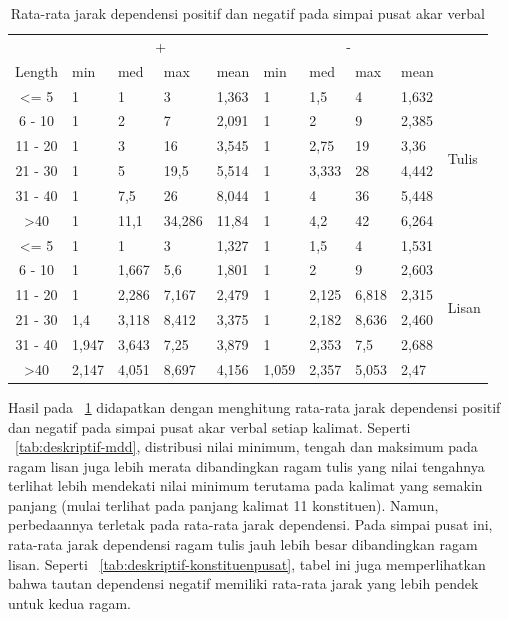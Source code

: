 \documentclass[10pt, a4paper, conference, compsocconf]{IEEEtran}
\begin{document}
\begin{table}
\begin{center}
\tiny
\caption{Rata-rata jarak dependensi positif dan negatif pada simpai pusat akar verbal}  \label{tab:deskriptif-mddpusat}
\begin{tabular}{c l l l l l l l l l}
\hline
 & \multicolumn{4}{c}{+} & \multicolumn{4}{c}{-} & \\  \cline{2-9}  
Length & min 	& med	& max 	& mean 	& min 	& med 	& max 	& mean 	& \\ \cline{1-10}  
\textless= 5 	& 1 		& 1 		& 3	 	& 1,363	& 1 		& 1,5		& 4	 	& 1,632	&\multirow{6}{*}{Tulis}\\
6 - 10 		& 1 		& 2		& 7	 	& 2,091	& 1 		& 2	 	& 9	 	& 2,385	& 	\\
11 - 20 		& 1 		& 3	 	& 16	 	& 3,545	& 1 		& 2,75 	& 19	 	& 3,36 	& 	\\
21 - 30 		& 1 		& 5	 	& 19,5 	& 5,514	& 1 		& 3,333	& 28		& 4,442	& 	\\ 
31 - 40 		& 1	 	& 7,5	 	& 26		& 8,044	& 1 		& 4		& 36		& 5,448	& 	\\
\textgreater 40 	& 1	 	& 11,1	& 34,286	& 11,84	& 1 		& 4,2		& 42		& 6,264	& 	\\ 
\hline
\textless= 5 	& 1 		& 1 		& 3		& 1,327	& 1 		& 1,5 	& 4		& 1,531	& \multirow{6}{*}{Lisan}\\
6 - 10 		& 1 		& 1,667	& 5,6		& 1,801	& 1 		& 2		& 9		& 2,603	& \\
11 - 20 		& 1 		& 2,286	& 7,167	& 2,479	& 1 		& 2,125	& 6,818	& 2,315	& \\
21 - 30 		& 1,4	 	& 3,118	& 8,412	& 3,375	& 1 		& 2,182	& 8,636	& 2,460	& \\ 
31 - 40 		& 1,947	& 3,643	& 7,25	& 3,879	& 1 		& 2,353	& 7,5		& 2,688	& \\
\textgreater 40 	& 2,147	 & 4,051	& 8,697	& 4,156	& 1,059	& 2,357	& 5,053	& 2,47	& \\ 
\hline
\end{tabular}
\end{center}
\end{table}

Hasil pada \tab~\ref{tab:deskriptif-mddpusat} didapatkan dengan menghitung rata-rata jarak dependensi positif dan negatif pada simpai pusat akar verbal setiap kalimat. Seperti \tab~\ref{tab:deskriptif-mdd}, distribusi nilai minimum, tengah dan maksimum pada ragam lisan juga lebih merata dibandingkan ragam tulis yang nilai tengahnya terlihat lebih mendekati nilai minimum terutama pada kalimat yang semakin panjang (mulai terlihat pada panjang kalimat 11 konstituen). Namun, perbedaannya terletak pada rata-rata jarak dependensi. Pada simpai pusat ini, rata-rata jarak dependensi ragam tulis jauh lebih besar dibandingkan ragam lisan. Seperti \tab~\ref{tab:deskriptif-konstituenpusat}, tabel ini juga memperlihatkan bahwa tautan dependensi negatif memiliki rata-rata jarak yang lebih pendek untuk kedua ragam. 
\end{document}
